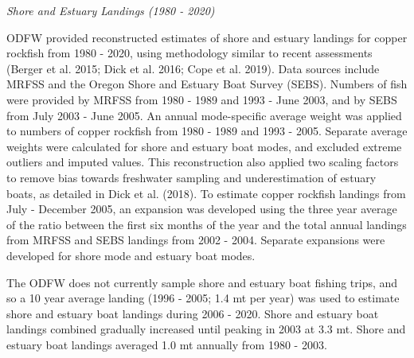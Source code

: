 \documentclass[11pt,
  english,
  a4paper,
]{article}
\begin{document}
\leavevmode\tagmcend\tagstructend\par


\emph{Shore and Estuary Landings (1980 - 2020)}

\leavevmode\tagmcend\tagstructend\par


ODFW provided reconstructed estimates of shore and estuary landings for copper rockfish from 1980 - 2020, using methodology similar to recent assessments {(Berger et al. 2015; Dick et al. 2016; Cope et al. 2019)\leavevmode\tagmcend\tagstructend}. Data sources include MRFSS and the Oregon Shore and Estuary Boat Survey (SEBS). Numbers of fish were provided by MRFSS from 1980 - 1989 and 1993 - June 2003, and by SEBS from July 2003 - June 2005. An annual mode-specific average weight was applied to numbers of copper rockfish from 1980 - 1989 and 1993 - 2005. Separate average weights were calculated for shore and estuary boat modes, and excluded extreme outliers and imputed values. This reconstruction also applied two scaling factors to remove bias towards freshwater sampling and underestimation of estuary boats, as detailed in Dick et al. {(2018)\leavevmode\tagmcend\tagstructend}. To estimate copper rockfish landings from July - December 2005, an expansion was developed using the three year average of the ratio between the first six months of the year and the total annual landings from MRFSS and SEBS landings from 2002 - 2004. Separate expansions were developed for shore mode and estuary boat modes.

\leavevmode\tagmcend\tagstructend\par


The ODFW does not currently sample shore and estuary boat fishing trips, and so a 10 year average landing (1996 - 2005; 1.4 mt per year) was used to estimate shore and estuary boat landings during 2006 - 2020. Shore and estuary boat landings combined gradually increased until peaking in 2003 at 3.3 mt. Shore and estuary boat landings averaged 1.0 mt annually from 1980 - 2003.

\leavevmode\tagmcend\tagstructend\par

\end{document}
